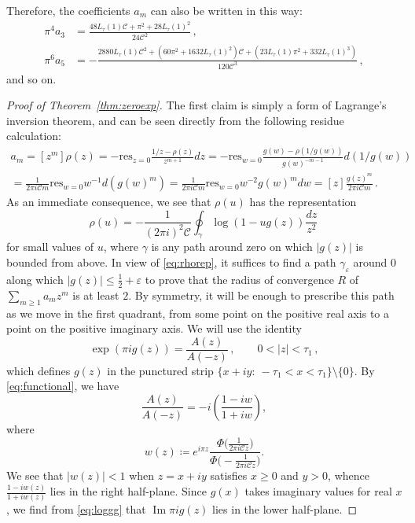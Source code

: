 \documentclass[12pt]{amsart}
\theoremstyle{plain}
\numberwithin{equation}{section}
\theoremstyle{definition}
\newcommand{\Cone}{\mathscr{C}}
\begin{document}
	 Therefore, the coefficients $a_m$ can also be written in this way:
	 \begin{equation} \label{eq:allaq}
	  \begin{aligned} 
	 \pi^4a_3 &= \frac{48L_{\tau}(1)\Cone + \pi^2 + 28L_{\tau}(1)^2}{24\Cone^2}\,,\\
	 \pi^6a_5 &= -\frac{2880L_{\tau}(1)\Cone^2 + (60\pi^2 + 1632L_{\tau}(1)^2)\Cone + (23L_{\tau}(1)\pi^2 + 332L_{\tau}(1)^3)}{120\Cone^3}\,,
	 \end{aligned}
	 \end{equation}
	 and so on.
\begin{proof}[Proof of Theorem~\ref{thm:zeroexp}]
	The first claim is simply a form of Lagrange's inversion theorem, and can be seen directly from the following residue calculation:
	\begin{multline*}
	a_m = [z^m]\rho(z) = -\mathrm{res}_{z=0}\frac{1/z-\rho(z)}{z^{m+1}}dz
	= -\mathrm{res}_{w=0}\frac{g(w)-\rho(1/g(w))}{g(w)^{-m-1}}d(1/g(w))\\
	= \frac{1}{2\pi i \Cone m}\mathrm{res}_{w=0}w^{-1}d(g(w)^{m})
	= \frac{1}{2\pi i \Cone m}\mathrm{res}_{w=0}w^{-2}g(w)^{m}dw = [z]\frac{g(z)^m}{2\pi i \Cone m}\,.
	\end{multline*}
	As an immediate consequence, we see that $\rho(u)$ has the representation
	\begin{equation} \label{eq:rhorep} \rho(u) = -\frac{1}{(2\pi i)^2 \Cone}\oint_{\gamma} \log(1-ug(z))\frac{dz}{z^2}\,\end{equation}
	for small values of $u$, where $\gamma$ is any path around zero on which $|g(z)|$ is bounded from above. In view of \eqref{eq:rhorep},  it suffices to find a path $\gamma_\varepsilon$ around $0$ along which $|g(z)|\le \frac12 + \varepsilon $ to prove that the radius of convergence $R$ of $\sum_{m\ge1}a_mz^m$ is at least $2$. By symmetry, it will be enough to prescribe this path as we move in the first quadrant, from some point on the positive real axis to a point on the positive imaginary axis. We will use the identity
	\begin{equation} \label{eq:loggg}  \exp(\pi i g(z)) = \frac{A(z)}{A(-z)}\,,\qquad 0<|z|<\tau_1\,,\end{equation}
	 which defines $g(z)$ in the punctured strip
$\{x+iy:\ -\tau_1< x<\tau_1 \}\setminus \{0\}$. By \eqref{eq:functional}, we have
\[ \frac{A(z)}{A(-z)}= -i \left(\frac{1-i w}{1+iw}\right), \]
where
\begin{equation} \label{eq:wdef} w(z)\coloneqq e^{i\pi z} \frac{\Phi\big(\frac{1}{2\pi i \Cone z}\big)}{\Phi\big(-\frac{1}{2\pi i \Cone z}\big)} . \end{equation}
We see that $|w(z)|<1$ when $z=x+iy$ satisfies $x\ge 0$ and $y> 0$, whence $\frac{1-i w(z)}{1+iw(z)}$ lies in the right half-plane. Since $g(x)$ takes imaginary values for real $x$, we find from \eqref{eq:loggg} that
$\operatorname{Im} \pi i g(z) $ lies in the lower half-plane.


\end{proof}
\end{document}
